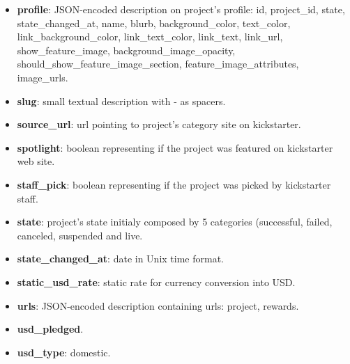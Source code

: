 \documentclass{article}
\begin{document}
\begin{itemize}
    \item \textbf{profile}: JSON-encoded description on project's profile: id, project\_id, state, state\_changed\_at, name, blurb, background\_color, text\_color, link\_background\_color, link\_text\_color, link\_text, link\_url, show\_feature\_image, background\_image\_opacity, should\_show\_feature\_image\_section, feature\_image\_attributes, image\_urls. 
    \item \textbf{slug}: small textual description with - as spacers.
    \item \textbf{source\_url}: url pointing to project's category site on kickstarter.
    \item \textbf{spotlight}: boolean representing if the project was featured on kickstarter web site.
    \item \textbf{staff\_pick}: boolean representing if the project was picked by kickstarter staff.
    \item \textbf{state}: project's state initialy composed by 5 categories (successful, failed, canceled, suspended and live.
    \item \textbf{state\_changed\_at}: date in Unix time format.
    \item \textbf{static\_usd\_rate}: static rate for currency conversion into USD.
    \item \textbf{urls}: JSON-encoded description containing urls: project, rewards.
    \item \textbf{usd\_pledged}.
    \item \textbf{usd\_type}: domestic.
    
\end{itemize} 
\end{document}
